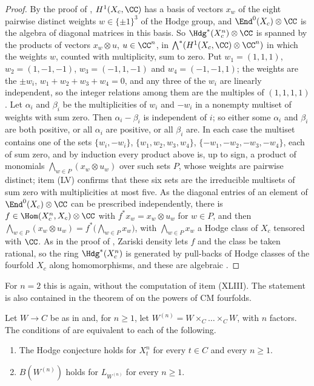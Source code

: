\begin{proof}
By the proof of , $H^{1}(X_{c},\CC)$ has a basis of
vectors $x_{w}$ of the eight pairwise distinct weights $w\in\{\pm1\}^{3}$ of
the Hodge group, and $\End^{0}(X_{c})\otimes\CC$ is the algebra of diagonal
matrices in this basis. So $\Hdg^{*}(X_{c}^{n})\otimes\CC$ is spanned by the
products of vectors $x_{w}\otimes u$, $u\in\CC^{n}$, in
$\bigwedge^{*}(H^{1}(X_{c},\CC)\otimes\CC^{n})$ in which the weights $w$,
counted with multiplicity, sum to zero. Put $w_{1}=(1,1,1)$,
$w_{2}=(1,-1,-1)$, $w_{3}=(-1,1,-1)$ and $w_{4}=(-1,-1,1)$; the weights are
the $\pm w_{i}$, $w_{1}+w_{2}+w_{3}+w_{4}=0$, and any three of the $w_{i}$ are
linearly independent, so the integer relations among them are the multiples
of $(1,1,1,1)$. Let $\alpha_{i}$ and $\beta_{i}$ be the multiplicities of $w_{i}$
and $-w_{i}$ in a nonempty multiset of weights with sum zero. Then
$\alpha_{i}-\beta_{i}$ is independent of $i$; so either some $\alpha_{i}$ and
$\beta_{i}$ are both positive, or all $\alpha_{i}$ are positive, or all
$\beta_{i}$ are. In each case the multiset contains one of the sets
$\{w_{i},-w_{i}\}$, $\{w_{1},w_{2},w_{3},w_{4}\}$,
$\{-w_{1},-w_{2},-w_{3},-w_{4}\}$, each of sum zero, and by induction every
product above is, up to sign, a product of monomials
$\bigwedge_{w\in P}(x_{w}\otimes u_{w})$ over such sets $P$, whose weights are
pairwise distinct; item (LV) confirms that these six sets are the
irreducible multisets of sum zero with multiplicities at most five. As the
diagonal entries of an element of $\End^{0}(X_{c})\otimes\CC$ can be
prescribed independently, there is $f\in\Hom(X_{c}^{n},X_{c})\otimes\CC$ with
$f^{*}x_{w}=x_{w}\otimes u_{w}$ for $w\in P$, and then
$\bigwedge_{w\in P}(x_{w}\otimes u_{w})=f^{*}\bigl(\bigwedge_{w\in P}x_{w}\bigr)$,
with $\bigwedge_{w\in P}x_{w}$ a Hodge class of $X_{c}$ tensored with $\CC$.
As in the proof of , Zariski density lets $f$ and the
class be taken rational, so the ring $\Hdg^{*}(X_{c}^{n})$ is generated by
pull-backs of Hodge classes of the fourfold $X_{c}$ along homomorphisms, and
these are algebraic \cite{Mar25a}.
\end{proof}

For $n=2$ this is  again, without the computation of item
(XLIII). The statement is also contained in the theorem of \cite{Li26} on the
powers of CM fourfolds.

\begin{corollary}
\label{cor:mumfordpowersequiv}
Let $W\to C$ be as in  and, for $n\ge1$, let
$W^{(n)}=W\times_{C}\dots\times_{C}W$, with $n$ factors. The conditions of
 are equivalent to each of the following.
\begin{enumerate}[label=\textup{(\alph*)},start=5,leftmargin=2.6em,itemsep=2pt]
\item The Hodge conjecture holds for $X_{t}^{n}$ for every $t\in C$ and
  every $n\ge1$.
\item $B(W^{(n)})$ holds for $L_{W^{(n)}}$ for every $n\ge1$.
\end{enumerate}
\end{corollary}

